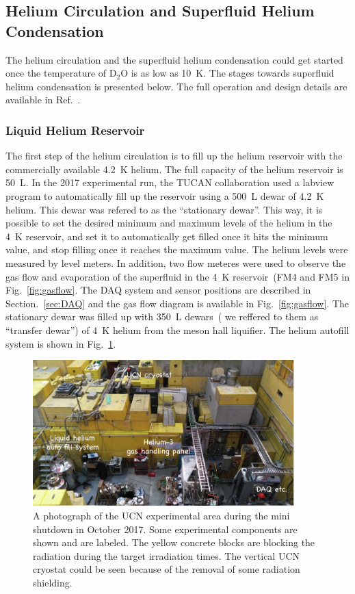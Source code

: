 \subsection{Helium Circulation and Superfluid Helium Condensation}
The helium circulation and the superfluid helium condensation could
get started once the temperature of D$_2$O is as low as 10~K. The
stages towards superfluid helium condensation is presented below. The
full operation and design details are available in
Ref.~\cite{matsumiya_thesis}.

\subsubsection{Liquid Helium Reservoir}
The first step of the helium circulation is to fill up the helium
reservoir with the commercially available 4.2~K helium. The full
capacity of the helium reservoir is 50~L. In the 2017 experimental
run, the TUCAN collaboration used a labview program to automatically
fill up the reservoir using a 500~L dewar of 4.2~K helium. This dewar
was refered to as the ``stationary dewar''. This way, it is possible
to set the desired minimum and maximum levels of the helium in the 4~K
reservoir, and set it to automatically get filled once it hits the
minimum value, and stop filling once it reaches the maximum value. The
helium levels were measured by level meters. In addition, two flow
meteres were used to observe the gas flow and evaporation of the
superfluid in the 4~K reservoir~(FM4 and FM5 in
Fig.~\ref{fig:gasflow}. The DAQ system and sensor positions are
described in Section.~\ref{sec:DAQ} and the gas flow diagram is
available in Fig.~\ref{fig:gasflow}. The stationary dewar was filled
up with 350~L dewars~( we reffered to them as ``transfer dewar'') of
4~K helium from the meson hall liquifier. The helium autofill system
is shown in Fig.~\ref{fig:ucnarea}.

\begin{figure}[h!]
  \centering
  \includegraphics[width=0.9\textwidth]{ucnarea.png}
  \caption[UCN experimental area during the mini shutdown in October
  2017]{A photograph of the UCN experimental area during the mini
    shutdown in October 2017. Some experimental components are shown
    and are labeled. The yellow concrete blocks are blocking the
    radiation during the target irradiation times. The vertical UCN
    cryostat could be seen because of the removal of some radiation
    shielding. }
  \label{fig:ucnarea}
\end{figure}

